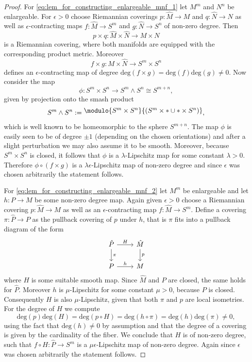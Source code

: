 \begin{proof}
    For \ref{eq:lem_for_constructing_enlargeable_mnf_1} let $M^m$ and $N^n$ be enlargeable. For $\epsilon > 0$ choose Riemannian coverings $p \colon \hat{M} \to M$ and $q \colon \hat{N} \to N$ as well as $\epsilon$-contracting maps $f \colon \hat{M} \to S^m$ and $g \colon \hat{N} \to S^n$ of non-zero degree. Then 
    \[
    p \times q \colon \hat{M} \times \hat{N} \to M \times N
    \]
    is a Riemannian covering, where both manifolds are equipped with the corresponding product metric. Moreover 
    \[
    f \times g \colon \hat{M} \times \hat{N} \to S^m \times S^n
    \]
    defines an $\epsilon$-contracting map of degree $\mathrm{deg}(f \times g) = \mathrm{deg}(f)\mathrm{deg}(g) \neq 0$. Now consider the map 
    \[
    \phi \colon S^m \times S^n \to S^m \wedge S^n \cong S^{m+n},
    \]
    given by projection onto the smash product 
    \[
    S^m \wedge S^n := \raisebox{3pt}{$\modulo{S^m \times S^n}{(S^m \times \ast \cup \ast \times S^n)}$},
    \]
    which is well known to be homeomorphic to the sphere $S^{m+n}$. The map $\phi$ is easily seen to be of degree $\pm 1$ (depending on the chosen orientations) and after a slight perturbation we may also assume it to be smooth. Moreover, because $S^m \times S^n$ is closed, it follows that $\phi$ is a $\lambda$-Lipschitz map for some constant $\lambda > 0$. Therefore $\phi \circ (f \times g)$ is a $\lambda \epsilon$-Lipschitz map of non-zero degree and since $\epsilon$ was chosen arbitrarily the statement follows.

    For \ref{eq:lem_for_constructing_enlargeable_mnf_2} let $M^m$ be enlargeable and let $h \colon P \to M$ be some non-zero degree map. Again given $\epsilon > 0$ choose a Riemannian covering $p \colon \hat{M} \to M$ as well as an $\epsilon$-contracting map $f \colon \hat{M} \to S^m$. Define a covering $\pi \colon \hat{P} \to P$ as the pullback covering of $p$ under $h$, that is $\pi$ fits into a pullback diagram of the form 
    \[\begin{tikzcd}
	{\hat{P}} & {\hat{M}} \\
	P & M
	\arrow["H", from=1-1, to=1-2]
	\arrow["\pi", from=1-1, to=2-1]
	\arrow["p", from=1-2, to=2-2]
	\arrow["h", from=2-1, to=2-2]
    \end{tikzcd}\]
    where $H$ is some suitable smooth map. Since $\hat{M}$ and $P$ are closed, the same holds for $\hat{P}$. Moreover $h$ is $\mu$-Lipschitz for some constant $\mu > 0$, because $P$ is closed. Consequently $H$ is also $\mu$-Lipschitz, given that both $\pi$ and $p$ are local isometries. For the degree of $H$ we compute 
    \[
    \mathrm{deg}(p)\mathrm{deg}(H) = \mathrm{deg}(p \circ H) = \mathrm{deg}(h \circ \pi) = \mathrm{deg}(h)\mathrm{deg}(\pi) \neq 0,
    \]
    using the fact that $\mathrm{deg}(h) \neq 0$ by assumption and that the degree of a covering is given by the cardinality of the fiber. We conclude that $H$ is of non-zero degree, such that $f \circ H \colon \hat{P} \to S^m$ is a $\mu \epsilon$-Lipschitz map of non-zero degree. Again since $\epsilon$ was chosen arbitrarily the statement follows.
\end{proof}

